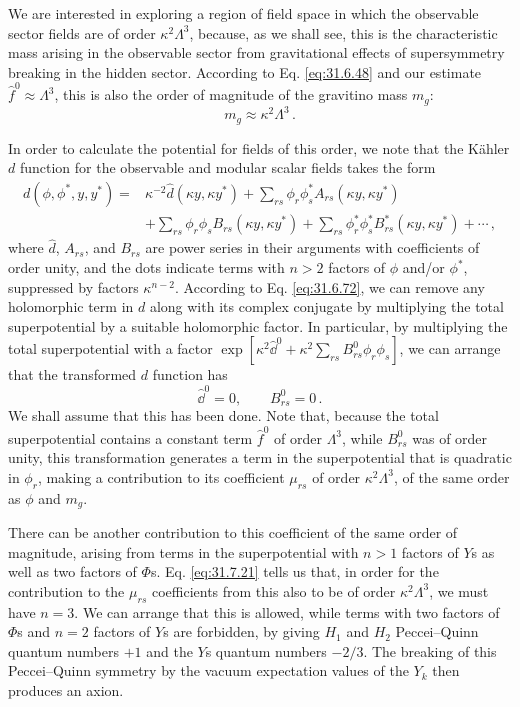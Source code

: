 We are interested in exploring a region of field space in which the
observable sector fields are of order \(\kappa^2\Lambda^3\), because, as we
shall see, this is the characteristic mass arising in the observable sector
from gravitational effects of supersymmetry breaking in the hidden sector.
According to Eq. \eqref{eq:31.6.48} and our estimate
\(\widehat f^0\approx\Lambda^3\), this is also the order of magnitude of the
gravitino mass \(m_g\):
\[
  m_g\approx\kappa^2\Lambda^3\,.
\]

In order to calculate the potential for fields of this order, we note that
the Kähler \(d\) function for the observable and modular scalar fields takes
the form
\begin{equation}
  \begin{aligned}
  d(\phi,\phi^*,y,y^*)={}&
  \kappa^{-2}\widehat d(\kappa y,\kappa y^*)
  +\sum_{rs}\phi_r\phi_s^*A_{rs}(\kappa y,\kappa y^*)
  \\
  &+\sum_{rs}\phi_r\phi_sB_{rs}(\kappa y,\kappa y^*)
  +\sum_{rs}\phi_r^*\phi_s^*B_{rs}^*(\kappa y,\kappa y^*)
  +\cdots\,,
  \end{aligned}
  \tag{31.7.23}\label{eq:31.7.23}
\end{equation}
where \(\widehat d\), \(A_{rs}\), and \(B_{rs}\) are power series in their
arguments with coefficients of order unity, and the dots indicate terms
with \(n>2\) factors of \(\phi\) and/or \(\phi^*\), suppressed by factors
\(\kappa^{n-2}\). According to Eq. \eqref{eq:31.6.72}, we can remove any
holomorphic term in \(d\) along with its complex conjugate by multiplying
the total superpotential by a suitable holomorphic factor. In particular,
by multiplying the total superpotential with a factor
\(\exp[\kappa^2\widehat \dd^0+
\kappa^2\sum_{rs}B_{rs}^0\phi_r\phi_s]\), we can arrange that the
transformed \(d\) function has
\begin{equation}
  \widehat \dd^0=0,\qquad B_{rs}^0=0\,.
  \tag{31.7.24}\label{eq:31.7.24}
\end{equation}
We shall assume that this has been done. Note that, because the total
superpotential contains a constant term \(\widehat f^0\) of order
\(\Lambda^3\), while \(B_{rs}^0\) was of order unity, this transformation
generates a term in the superpotential that is quadratic in \(\phi_r\),
making a contribution to its coefficient \(\mu_{rs}\) of order
\(\kappa^2\Lambda^3\), of the same order as \(\phi\) and \(m_g\).

There can be another contribution to this coefficient of the same order of
magnitude, arising from terms in the superpotential with \(n>1\) factors of
\(Y\)s as well as two factors of \(\Phi\)s. Eq. \eqref{eq:31.7.21} tells us
that, in order for the contribution to the \(\mu_{rs}\) coefficients from
this also to be of order \(\kappa^2\Lambda^3\), we must have \(n=3\). We can
arrange that this is allowed, while terms with two factors of \(\Phi\)s and
\(n=2\) factors of \(Y\)s are forbidden, by giving \(H_1\) and \(H_2\)
Peccei--Quinn quantum numbers \(+1\) and the \(Y\)s quantum numbers
\(-2/3\). The breaking of this Peccei--Quinn symmetry by the vacuum
expectation values of the \(Y_k\) then produces an axion.

